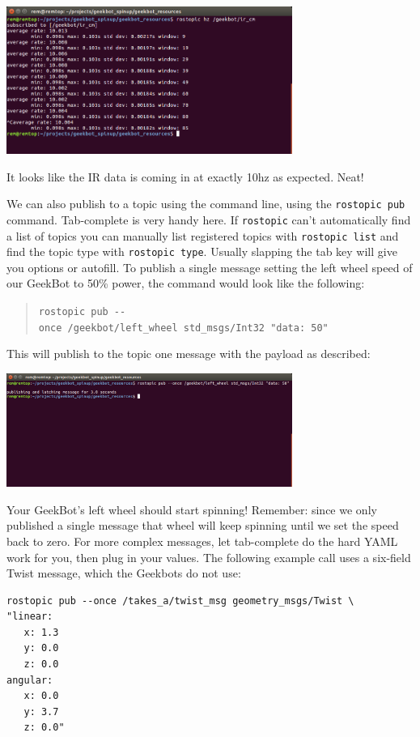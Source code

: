 \includegraphics[width=0.7\textwidth,height=\textheight]{figures/geekbot/repo_usage/hz_ir.png}

It looks like the IR data is coming in at exactly 10hz as expected.
Neat!

We can also publish to a topic using the command line, using the
\texttt{rostopic\ pub} command. Tab-complete is very handy here. If
\texttt{rostopic} can't automatically find a list of topics you can
manually list registered topics with \texttt{rostopic\ list} and find
the topic type with \texttt{rostopic\ type}. Usually slapping the tab
key will give you options or autofill. To publish a single message
setting the left wheel speed of our GeekBot to 50\% power, the command
would look like the following:

\begin{quote}
\texttt{rostopic\ pub\ -\/-once\ /geekbot/left\_wheel\ std\_msgs/Int32\ "data:\ 50"}
\end{quote}

This will publish to the topic one message with the payload as
described:

\includegraphics[width=0.7\textwidth,height=\textheight]{figures/geekbot/repo_usage/drive_left.png}

Your GeekBot's left wheel should start spinning! Remember: since we only
published a single message that wheel will keep spinning until we set
the speed back to zero. For more complex messages, let tab-complete do
the hard YAML work for you, then plug in your values. The following
example call uses a six-field Twist message, which the Geekbots do not
use:

\begin{verbatim}
rostopic pub --once /takes_a/twist_msg geometry_msgs/Twist \
"linear:
   x: 1.3
   y: 0.0
   z: 0.0
angular:
   x: 0.0
   y: 3.7
   z: 0.0"
\end{verbatim}

